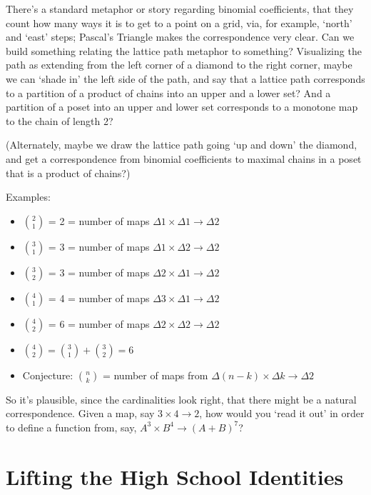 \documentclass{proc-l}
\theoremstyle{definition}
\theoremstyle{remark}
\numberwithin{equation}{section}
\begin{document}
There's a standard metaphor or story regarding binomial coefficients, that they count how many ways it is to get to a point on a grid, via, for example, `north' and `east' steps; Pascal's Triangle makes the correspondence very clear. Can we build something relating the lattice path metaphor to something? Visualizing the path as extending from the left corner of a diamond to the right corner, maybe we can `shade in' the left side of the path, and say that a lattice path corresponds to a partition of a product of chains into an upper and a lower set? And a partition of a poset into an upper and lower set corresponds to a monotone map to the chain of length 2? 

(Alternately, maybe we draw the lattice path going `up and down' the diamond, and get a correspondence from binomial coefficients to maximal chains in a poset that is a product of chains?)

Examples:
\begin{itemize}
    \item \({2 \choose 1}\) = 2 = number of maps \(\Delta 1 \times \Delta 1 \to \Delta 2\)
    \item \({3 \choose 1}\) = 3 = number of maps \(\Delta 1 \times \Delta 2 \to \Delta 2\)
    \item \({3 \choose 2}\) = 3 = number of maps \(\Delta 2 \times \Delta 1 \to \Delta 2\)
    \item \({4 \choose 1}\) = 4 = number of maps \(\Delta 3 \times \Delta 1 \to \Delta 2\)
    \item \({4 \choose 2}\) = 6 = number of maps \(\Delta 2 \times \Delta 2 \to \Delta 2\)
    \item \({4 \choose 2} = {3 \choose 1} + {3 \choose 2} = 6\)

    \item Conjecture: \({n \choose k}\) = number of maps from \(\Delta (n - k) \times \Delta k \to \Delta 2\)
\end{itemize}


So it's plausible, since the cardinalities look right, that there might be a natural correspondence. Given a map, say \(3 \times 4 \to 2\), how would you `read it out' in order to define a function from, say, \(A^3 \times B^4 \to (A + B)^7\)? 

\section{Lifting the High School Identities}
\end{document}
